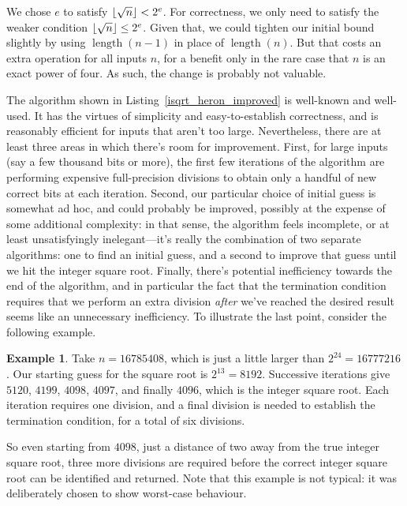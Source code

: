 \documentclass[a4paper]{article}
\DeclarePairedDelimiter\floor{\lfloor}{\rfloor}
\DeclareMathOperator{\length}{length}
\theoremstyle{plain}
\theoremstyle{definition}
\newtheorem{example}[theorem]{Example}
\begin{document}


We chose $e$ to satisfy $\floor{\sqrt n} < 2^e$. For correctness, we only need
to satisfy the weaker condition $\floor{\sqrt n} \le 2^e$. Given that, we could
tighten our initial bound slightly by using $\length(n-1)$ in place of
$\length(n)$. But that costs an extra operation for all inputs $n$, for a
benefit only in the rare case that $n$ is an exact power of four. As such, the
change is probably not valuable.

The algorithm shown in Listing~\ref{isqrt_heron_improved} is well-known and
well-used. It has the virtues of simplicity and easy-to-establish correctness,
and is reasonably efficient for inputs that aren't too large. Nevertheless,
there are at least three areas in which there's room for improvement. First,
for large inputs (say a few thousand bits or more), the first few iterations of
the algorithm are performing expensive full-precision divisions to obtain only
a handful of new correct bits at each iteration. Second, our particular choice
of initial guess is somewhat ad hoc, and could probably be improved, possibly
at the expense of some additional complexity: in that sense, the algorithm
feels incomplete, or at least unsatisfyingly inelegant---it's really the
combination of two separate algorithms: one to find an initial guess, and a
second to improve that guess until we hit the integer square root. Finally,
there's potential inefficiency towards the end of the algorithm, and in
particular the fact that the termination condition requires that we perform an
extra division \emph{after} we've reached the desired result seems like an
unnecessary inefficiency. To illustrate the last point, consider the following
example.

\begin{example}
  Take $n = 16785408$, which is just a little larger than $2^{24} = 16777216$.
  Our starting guess for the square root is $2^{13} = 8192$. Successive
  iterations give $5120$, $4199$, $4098$, $4097$, and finally $4096$, which
  is the integer square root. Each iteration requires one division, and
  a final division is needed to establish the termination condition, for
  a total of six divisions.
\end{example}

So even starting from $4098$, just a distance of two away from the true integer
square root, three more divisions are required before the correct integer
square root can be identified and returned. Note that this example is not
typical: it was deliberately chosen to show worst-case behaviour.
\end{document}
